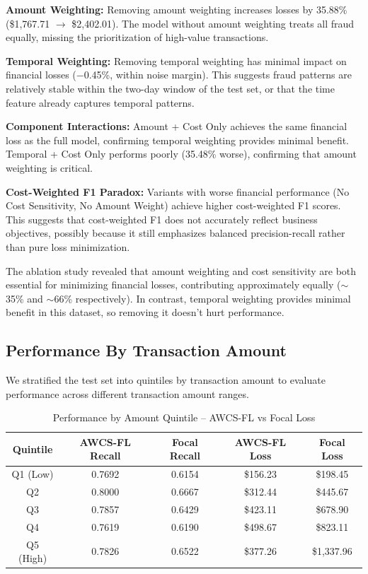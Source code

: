 \documentclass[10pt,twocolumn,letterpaper]{article}
\begin{document}
\textbf{Amount Weighting:} Removing amount weighting increases losses by 35.88\% (\$1,767.71 $\rightarrow$ \$2,402.01). The model without amount weighting treats all fraud equally, missing the prioritization of high-value transactions.

\textbf{Temporal Weighting:} Removing temporal weighting has minimal impact on financial losses ($-$0.45\%, within noise margin). This suggests fraud patterns are relatively stable within the two-day window of the test set, or that the time feature already captures temporal patterns.

\textbf{Component Interactions:} Amount + Cost Only achieves the same financial loss as the full model, confirming temporal weighting provides minimal benefit. Temporal + Cost Only performs poorly (35.48\% worse), confirming that amount weighting is critical.

\textbf{Cost-Weighted F1 Paradox:} Variants with worse financial performance (No Cost Sensitivity, No Amount Weight) achieve higher cost-weighted F1 scores. This suggests that cost-weighted F1 does not accurately reflect business objectives, possibly because it still emphasizes balanced precision-recall rather than pure loss minimization.

The ablation study revealed that amount weighting and cost sensitivity are both essential for minimizing financial losses, contributing approximately equally ($\sim$35\% and $\sim$66\% respectively). In contrast, temporal weighting provides minimal benefit in this dataset, so removing it doesn't hurt performance.

\subsection{Performance By Transaction Amount}

We stratified the test set into quintiles by transaction amount to evaluate performance across different transaction amount ranges.

\begin{table}[t]
\centering
\scriptsize
\begin{tabular}{|c|c|c|c|c|}
\hline
\textbf{Quintile} & \textbf{AWCS-FL Recall} & \textbf{Focal Recall} & \textbf{AWCS-FL Loss} & \textbf{Focal Loss} \\
\hline
Q1 (Low) & 0.7692 & 0.6154 & \$156.23 & \$198.45 \\
Q2 & 0.8000 & 0.6667 & \$312.44 & \$445.67 \\
Q3 & 0.7857 & 0.6429 & \$423.11 & \$678.90 \\
Q4 & 0.7619 & 0.6190 & \$498.67 & \$823.11 \\
Q5 (High) & 0.7826 & 0.6522 & \$377.26 & \$1,337.96 \\
\hline
\end{tabular}
\caption{Performance by Amount Quintile -- AWCS-FL vs Focal Loss}
\label{table:quintile}
\end{table}
\end{document}
